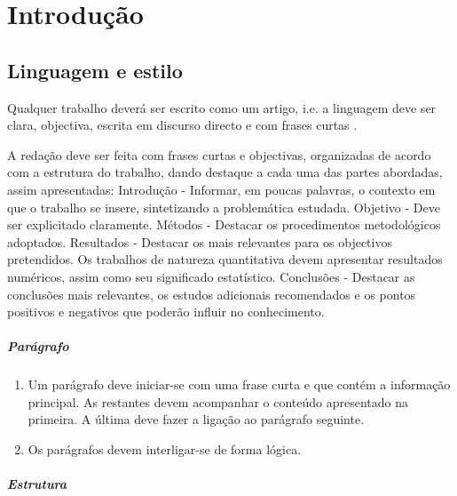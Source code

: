 % 
%  
%
\chapter{Introdução}
\label{cha:introduction_test}

\section{Linguagem e estilo}
Qualquer trabalho deverá ser escrito como um artigo, i.e. a linguagem deve ser clara, objectiva, escrita em discurso directo e com frases curtas \cite{gustavii2016write, glasman2010science}.

A redação deve ser feita com frases curtas e objectivas, organizadas de acordo com a estrutura do trabalho, dando destaque a cada uma das partes abordadas, assim apresentadas: Introdução - Informar, em poucas palavras, o contexto em que o trabalho se insere, sintetizando a problemática estudada. Objetivo - Deve ser explicitado claramente. Métodos - Destacar os procedimentos metodológicos adoptados. Resultados - Destacar os mais relevantes para os objectivos pretendidos. Os trabalhos de natureza quantitativa devem apresentar resultados numéricos, assim como seu significado estatístico. Conclusões - Destacar as conclusões mais relevantes, os estudos adicionais recomendados e os pontos positivos e negativos que poderão influir no conhecimento. 

\paragraph{Parágrafo}
\begin{enumerate}
\item Um parágrafo  deve iniciar-se com uma frase curta e que contém a informação principal. As restantes devem acompanhar o conteúdo apresentado na primeira. A última deve fazer a ligação ao parágrafo seguinte.
\item Os parágrafos devem interligar-se de forma lógica.
\end{enumerate}

\paragraph{Estrutura}

